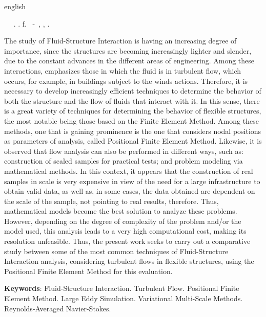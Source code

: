 \documentclass[_ArquivoPrincipal.tex]{subfiles}
\begin{document}
	\begin{resumo}[Abstract]
		\begin{otherlanguage*}{english}
			\begin{flushleft} 
				\setlength{\absparsep}{0pt} %
				\SingleSpacing 
				\imprimirautorabr~ ~\textbf{\imprimirtitleabstract}.	\imprimirdata.  \pageref{LastPage}f. 
				\imprimirtipotrabalho~-~\imprimirinstituicao, \imprimirlocal, 	\imprimirdata. 
			\end{flushleft}
			\OnehalfSpacing 
			The study of Fluid-Structure Interaction is having an increasing degree of importance, since the structures are becoming increasingly lighter and slender, due to the constant advances in the different areas of engineering. Among these interactions, emphasizes those in which the fluid is in turbulent flow, which occurs, for example, in buildings subject to the winds actions. Therefore, it is necessary to develop increasingly efficient techniques to determine the behavior of both the structure and the flow of fluids that interact with it. In this sense, there is a great variety of techniques for determining the behavior of flexible structures, the most notable being those based on the Finite Element Method. Among these methods, one that is gaining prominence is the one that considers nodal positions as parameters of analysis, called Positional Finite Element Method. Likewise, it is observed that flow analysis can also be performed in different ways, such as: construction of scaled samples for practical tests; and problem modeling via mathematical methods. In this context, it appears that the construction of real samples in scale is very expensive in view of the need for a large infrastructure to obtain valid data, as well as, in some cases, the data obtained are dependent on the scale of the sample, not pointing to real results, therefore. Thus, mathematical models become the best solution to analyze these problems. However, depending on the degree of complexity of the problem and/or the model used, this analysis leads to a very high computational cost, making its resolution unfeasible. Thus, the present work seeks to carry out a comparative study between some of the most common techniques of Fluid-Structure Interaction analysis, considering turbulent flows in flexible structures, using the Positional Finite Element Method for this evaluation.
			\vspace{\onelineskip}
			
			\noindent 
			\textbf{Keywords}: Fluid-Structure Interaction. Turbulent Flow. Positional Finite Element Method. Large Eddy Simulation. Variational Multi-Scale Methods. Reynolds-Averaged Navier-Stokes.
		\end{otherlanguage*}
	\end{resumo}
\end{document}
